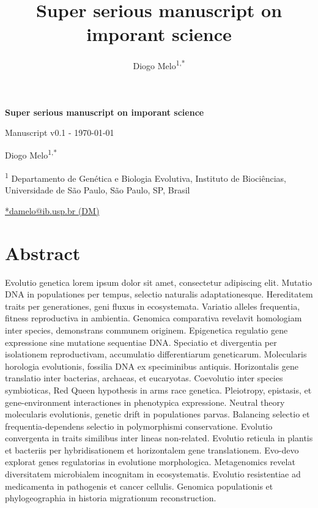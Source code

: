 \documentclass[
]{article}
\title{Super serious manuscript on imporant science}
\author{Diogo Melo\textsuperscript{1,*}}
\date{}
\begin{document}
\makeatletter
\renewcommand{\maketitle}{\setlength{\parindent}{0pt}
\begin{flushleft}
    \huge{\titlefont \textbf{Super serious manuscript on imporant
science}}
    
          \vspace{0.2cm}
      \small{Manuscript v0.1 - \today}
    
    \vspace{0.2cm}

    \Large{Diogo Melo\textsuperscript{1,*}}

    \vspace{0.3cm}

\end{flushleft}
}
\makeatother
\maketitle



\footnotesize
\textsuperscript{1} Departamento de Genética e Biologia Evolutiva,
Instituto de Biociências, Universidade de São Paulo, São Paulo, SP,
Brasil

\href{mailto:damelo@ib.usp.br}{*damelo@ib.usp.br (DM)}

\normalsize

\section{Abstract}\label{abstract}

Evolutio genetica lorem ipsum dolor sit amet, consectetur adipiscing
elit. Mutatio DNA in populationes per tempus, selectio naturalis
adaptationesque. Hereditatem traits per generationes, geni fluxus in
ecosystemata. Variatio alleles frequentia, fitness reproductiva in
ambientia. Genomica comparativa revelavit homologiam inter species,
demonstrans communem originem. Epigenetica regulatio gene expressione
sine mutatione sequentiae DNA. Speciatio et divergentia per isolationem
reproductivam, accumulatio differentiarum geneticarum. Molecularis
horologia evolutionis, fossilia DNA ex speciminibus antiquis.
Horizontalis gene translatio inter bacterias, archaeas, et eucaryotas.
Coevolutio inter species symbioticas, Red Queen hypothesis in arms race
genetica. Pleiotropy, epistasis, et gene-environment interactiones in
phenotypica expressione. Neutral theory molecularis evolutionis, genetic
drift in populationes parvas. Balancing selectio et frequentia-dependens
selectio in polymorphismi conservatione. Evolutio convergenta in traits
similibus inter lineas non-related. Evolutio reticula in plantis et
bacteriis per hybridisationem et horizontalem gene translationem.
Evo-devo explorat genes regulatorias in evolutione morphologica.
Metagenomics revelat diversitatem microbialem incognitam in
ecosystematis. Evolutio resistentiae ad medicamenta in pathogenis et
cancer cellulis. Genomica populationis et phylogeographia in historia
migrationum reconstruction.
\end{document}
